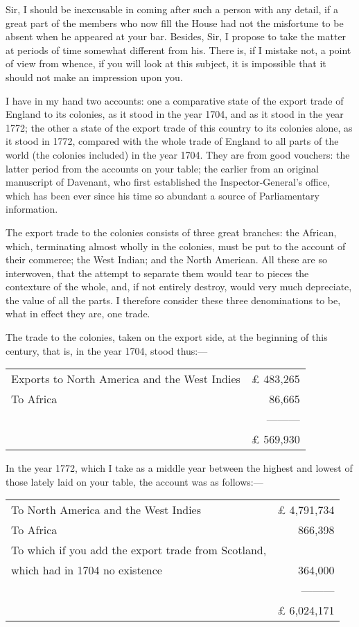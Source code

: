 Sir, I should be inexcusable in coming after such a person with any detail, if a great part of the members who now fill the House had not the misfortune to be absent when he appeared at your bar. Besides, Sir, I propose to take the matter at periods of time somewhat different from his. There is, if I mistake not, a point of view from whence, if you will look at this subject, it is impossible that it should not make an impression upon you.

I have in my hand two accounts: one a comparative state of the export trade of England to its colonies, as it stood in the year 1704, and as it stood in the year 1772; the other a state of the export trade of this country to its colonies alone, as it stood in 1772, compared with the whole trade of England to all parts of the world (the colonies included) in the year 1704. They are from good vouchers: the latter period from the accounts on your table; the earlier from an original manuscript of Davenant, who first established the Inspector-General's office, which has been ever since his time so abundant a source of Parliamentary information.

The export trade to the colonies consists of three great branches: the African, which, terminating almost wholly in the colonies, must be put to the account of their commerce; the West Indian; and the North American. All these are so interwoven, that the attempt to separate them would tear to pieces the contexture of the whole, and, if not entirely destroy, would very much depreciate, the value of all the parts. I therefore consider these three denominations to be, what in effect they are, one trade.

The trade to the colonies, taken on the export side, at the beginning of this century, that is, in the year 1704, stood thus:—

\begin{center}
\begin{tabular}{l r}
Exports to North America and the West Indies & £ 483,265 \\
To Africa & 86,665 \\
	      & ———  \\
          & £ 569,930
\end{tabular}
\end{center}

In the year 1772, which I take as a middle year between the highest and lowest of those lately laid on your table, the account was as follows:—

\begin{center}
\begin{tabular}{l r}
To North America and the West Indies & £ 4,791,734 \\
To Africa	& 866,398 \\
To which if you add the export trade from Scotland, & \\
which had in 1704 no existence & 364,000 \\
	      & ———  \\
          & £ 6,024,171
\end{tabular}
\end{center}


